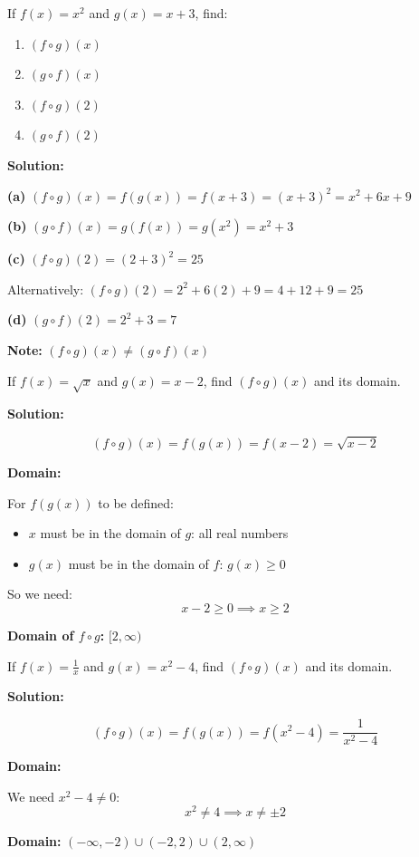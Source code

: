 \documentclass[12pt,a4paper]{article}
\begin{document}
\begin{example}
If $f(x) = x^2$ and $g(x) = x + 3$, find:
\begin{enumerate}[label=(\alph*)]
    \item $(f \circ g)(x)$
    \item $(g \circ f)(x)$
    \item $(f \circ g)(2)$
    \item $(g \circ f)(2)$
\end{enumerate}

\textbf{Solution:}

\textbf{(a)} $(f \circ g)(x) = f(g(x)) = f(x+3) = (x+3)^2 = x^2 + 6x + 9$

\textbf{(b)} $(g \circ f)(x) = g(f(x)) = g(x^2) = x^2 + 3$

\textbf{(c)} $(f \circ g)(2) = (2+3)^2 = 25$

Alternatively: $(f \circ g)(2) = 2^2 + 6(2) + 9 = 4 + 12 + 9 = 25$

\textbf{(d)} $(g \circ f)(2) = 2^2 + 3 = 7$

\textbf{Note:} $(f \circ g)(x) \neq (g \circ f)(x)$
\end{example}

\begin{example}
If $f(x) = \sqrt{x}$ and $g(x) = x - 2$, find $(f \circ g)(x)$ and its domain.

\textbf{Solution:}

\[
(f \circ g)(x) = f(g(x)) = f(x-2) = \sqrt{x-2}
\]

\textbf{Domain:}

For $f(g(x))$ to be defined:
\begin{itemize}
    \item $x$ must be in the domain of $g$: all real numbers
    \item $g(x)$ must be in the domain of $f$: $g(x) \geq 0$
\end{itemize}

So we need:
\[
x - 2 \geq 0 \implies x \geq 2
\]

\textbf{Domain of $f \circ g$:} $[2, \infty)$
\end{example}

\begin{example}
If $f(x) = \frac{1}{x}$ and $g(x) = x^2 - 4$, find $(f \circ g)(x)$ and its domain.

\textbf{Solution:}

\[
(f \circ g)(x) = f(g(x)) = f(x^2 - 4) = \frac{1}{x^2 - 4}
\]

\textbf{Domain:}

We need $x^2 - 4 \neq 0$:
\[
x^2 \neq 4 \implies x \neq \pm 2
\]

\textbf{Domain:} $(-\infty, -2) \cup (-2, 2) \cup (2, \infty)$
\end{example}
\end{document}
